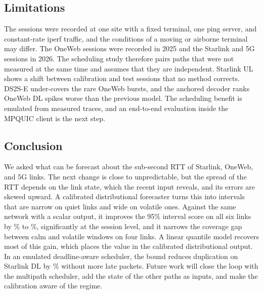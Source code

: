 \subsection{Limitations}
The sessions were recorded at one site with a fixed terminal, one ping server, and constant-rate iperf traffic, and the conditions of a moving or airborne terminal may differ. The OneWeb sessions were recorded in 2025 and the Starlink and 5G sessions in 2026. The scheduling study therefore pairs paths that were not measured at the same time and assumes that they are independent. Starlink UL shows a shift between calibration and test sessions that no method corrects. DS2S-E under-covers the rare OneWeb bursts, and the anchored decoder ranks OneWeb DL spikes worse than the previous model. The scheduling benefit is emulated from measured traces, and an end-to-end evaluation inside the MPQUIC client is the next step.

\subsection{Conclusion}
We asked what can be forecast about the sub-second RTT of Starlink, OneWeb, and 5G links. The next change is close to unpredictable, but the spread of the RTT depends on the link state, which the recent input reveals, and its errors are skewed upward. A calibrated distributional forecaster turns this into intervals that are narrow on quiet links and wide on volatile ones. Against the same network with a scalar output, it improves the 95\% interval score on all six links by \BSISWorstAbs\% to \BSISBestAbs\%, significantly at the session level, and it narrows the coverage gap between calm and volatile windows on four links. A linear quantile model recovers most of this gain, which places the value in the calibrated distributional output. In an emulated deadline-aware scheduler, the bound reduces duplication on Starlink DL by \SchedSaveSLDL\% without more late packets. Future work will close the loop with the multipath scheduler, add the state of the other paths as inputs, and make the calibration aware of the regime.
